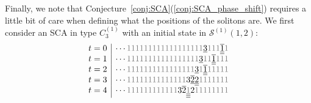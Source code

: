 \documentclass[reqno]{amsart}
\newcommand{\Sol}{\mathcal{S}} %
\theoremstyle{plain}
\theoremstyle{definition}
\numberwithin{equation}{section}
\begin{document}
Finally, we note that Conjecture~\ref{conj:SCA}(\ref{conj:SCA_phase_shift}) requires a little bit of care when defining what the positions of the solitons are.
We first consider an SCA in type $C_3^{(1)}$ with an initial state in $\Sol^{(1)}(1,2)$:
\[
{\begin{array}{c|c}
t = 0 & \cdots {\color{gray} 1} {\color{gray} 1} {\color{gray} 1} {\color{gray} 1} {\color{gray} 1} {\color{gray} 1} {\color{gray} 1} {\color{gray} 1} {\color{gray} 1} {\color{gray} 1} {\color{gray} 1} {\color{gray} 1} {\color{gray} 1} {\color{gray} 1} {\color{gray} 1} {\color{gray} 1} {\color{gray} 1} {\color{gray} 1} \underline{3} {\color{gray} 1} {\color{gray} 1} {\color{gray} 1} \underline{\underline{\overline{1}}} {\color{gray} 1} \\
t = 1 & \cdots {\color{gray} 1} {\color{gray} 1} {\color{gray} 1} {\color{gray} 1} {\color{gray} 1} {\color{gray} 1} {\color{gray} 1} {\color{gray} 1} {\color{gray} 1} {\color{gray} 1} {\color{gray} 1} {\color{gray} 1} {\color{gray} 1} {\color{gray} 1} {\color{gray} 1} {\color{gray} 1} {\color{gray} 1}\underline{3} {\color{gray} 1} {\color{gray} 1} \underline{\underline{\overline{1}}} {\color{gray} 1} {\color{gray} 1} {\color{gray} 1} \\
t = 2 & \cdots {\color{gray} 1} {\color{gray} 1} {\color{gray} 1} {\color{gray} 1} {\color{gray} 1} {\color{gray} 1} {\color{gray} 1} {\color{gray} 1} {\color{gray} 1} {\color{gray} 1} {\color{gray} 1} {\color{gray} 1} {\color{gray} 1} {\color{gray} 1} {\color{gray} 1} {\color{gray} 1} \underline{3} {\color{gray} 1} \underline{\underline{\overline{1}}} {\color{gray} 1} {\color{gray} 1} {\color{gray} 1} {\color{gray} 1} {\color{gray} 1} \\
t = 3 & \cdots {\color{gray} 1} {\color{gray} 1} {\color{gray} 1} {\color{gray} 1} {\color{gray} 1} {\color{gray} 1} {\color{gray} 1} {\color{gray} 1} {\color{gray} 1} {\color{gray} 1} {\color{gray} 1} {\color{gray} 1} {\color{gray} 1} {\color{gray} 1} 3 \underline{\overline{2}} \underline{\underline{2}} {\color{gray} 1} {\color{gray} 1} {\color{gray} 1} {\color{gray} 1} {\color{gray} 1} {\color{gray} 1} {\color{gray} 1} \\
t = 4 & \cdots {\color{gray} 1} {\color{gray} 1} {\color{gray} 1} {\color{gray} 1} {\color{gray} 1} {\color{gray} 1} {\color{gray} 1} {\color{gray} 1} {\color{gray} 1} {\color{gray} 1} {\color{gray} 1} {\color{gray} 1} 3 \overline{2} \underline{\underline{\underline{{\color{gray} 1}}}} 2 {\color{gray} 1} {\color{gray} 1} {\color{gray} 1} {\color{gray} 1} {\color{gray} 1} {\color{gray} 1} {\color{gray} 1} {\color{gray} 1} \\

\end{array}}\]
\end{document}
